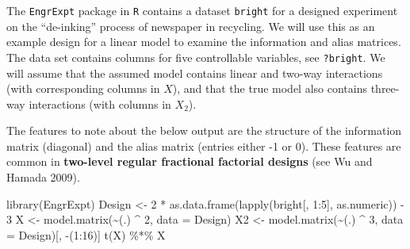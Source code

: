 \documentclass[
]{article}
\newenvironment{Shaded}{\begin{snugshade}}{\end{snugshade}}
\newcommand{\AttributeTok}[1]{\textcolor[rgb]{0.77,0.63,0.00}{#1}}
\newcommand{\DecValTok}[1]{\textcolor[rgb]{0.00,0.00,0.81}{#1}}
\newcommand{\FunctionTok}[1]{\textcolor[rgb]{0.00,0.00,0.00}{#1}}
\newcommand{\NormalTok}[1]{#1}
\newcommand{\OtherTok}[1]{\textcolor[rgb]{0.56,0.35,0.01}{#1}}
\newcommand{\SpecialCharTok}[1]{\textcolor[rgb]{0.00,0.00,0.00}{#1}}
\begin{document}
The \texttt{EngrExpt} package in \texttt{R} contains a dataset
\texttt{bright} for a designed experiment on the ``de-inking'' process
of newspaper in recycling. We will use this as an example design for a
linear model to examine the information and alias matrices. The data set
contains columns for five controllable variables, see \texttt{?bright}.
We will assume that the assumed model contains linear and two-way
interactions (with corresponding columns in \(X\)), and that the true
model also contains three-way interactions (with columns in \(X_2\)).

The features to note about the below output are the structure of the
information matrix (diagonal) and the alias matrix (entries either -1 or
0). These features are common in \textbf{two-level regular fractional
factorial designs} (see Wu and Hamada 2009).

\begin{Shaded}
\begin{Highlighting}[]
\FunctionTok{library}\NormalTok{(EngrExpt)}
\NormalTok{Design }\OtherTok{\textless{}{-}} \DecValTok{2} \SpecialCharTok{*} \FunctionTok{as.data.frame}\NormalTok{(}\FunctionTok{lapply}\NormalTok{(bright[, }\DecValTok{1}\SpecialCharTok{:}\DecValTok{5}\NormalTok{], as.numeric)) }\SpecialCharTok{{-}} \DecValTok{3}
\NormalTok{X }\OtherTok{\textless{}{-}} \FunctionTok{model.matrix}\NormalTok{(}\SpecialCharTok{\textasciitilde{}}\NormalTok{(.) }\SpecialCharTok{\^{}} \DecValTok{2}\NormalTok{, }\AttributeTok{data =}\NormalTok{ Design)}
\NormalTok{X2 }\OtherTok{\textless{}{-}} \FunctionTok{model.matrix}\NormalTok{(}\SpecialCharTok{\textasciitilde{}}\NormalTok{(.) }\SpecialCharTok{\^{}} \DecValTok{3}\NormalTok{, }\AttributeTok{data =}\NormalTok{ Design)[, }\SpecialCharTok{{-}}\NormalTok{(}\DecValTok{1}\SpecialCharTok{:}\DecValTok{16}\NormalTok{)]}
\FunctionTok{t}\NormalTok{(X) }\SpecialCharTok{\%*\%}\NormalTok{ X}
\end{Highlighting}
\end{Shaded}
\end{document}

